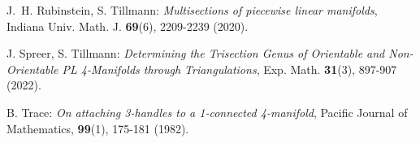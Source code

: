 \documentclass[12pt,a4paper]{article}
\begin{document}
\begin{thebibliography}{00}
{ 
J.~H. Rubinstein, S. Tillmann: {\it Multisections of piecewise linear manifolds},  Indiana Univ. Math. J.  {\bf 69}(6), 2209-2239 (2020). 

J. Spreer, S. Tillmann: {\it Determining the Trisection Genus of Orientable and Non-Orientable PL 4-Manifolds through Triangulations},  Exp. Math. {\bf  31}(3), 897-907 (2022).  %

\bibitem{[Trace 1982]}
B. Trace: {\it On attaching 3-handles to a 1-connected 4-manifold}, Pacific Journal of Mathematics, {\bf 99}(1), 175-181 (1982).   

}
\end{thebibliography}
\end{document}
